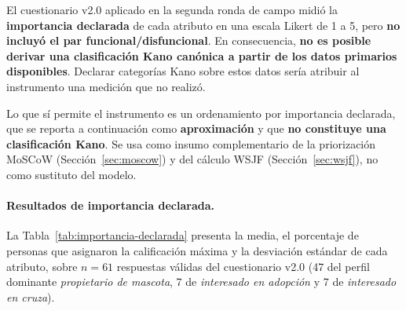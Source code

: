 \documentclass[journal,onecolumn]{IEEEtran}
\begin{document}
	El cuestionario v2.0 aplicado en la segunda ronda de campo midió la
	\textbf{importancia declarada} de cada atributo en una escala Likert de 1 a
	5, pero \textbf{no incluyó el par funcional/disfuncional}. En consecuencia,
	\textbf{no es posible derivar una clasificación Kano canónica a partir de
		los datos primarios disponibles}. Declarar categorías Kano sobre estos datos
	sería atribuir al instrumento una medición que no realizó.
	
	Lo que sí permite el instrumento es un ordenamiento por importancia
	declarada, que se reporta a continuación como \textbf{aproximación} y que
	\textbf{no constituye una clasificación Kano}. Se usa como insumo
	complementario de la priorización MoSCoW (Sección~\ref{sec:moscow}) y del
	cálculo WSJF (Sección~\ref{sec:wsjf}), no como sustituto del modelo.
	
	\paragraph{Resultados de importancia declarada.}
	La Tabla~\ref{tab:importancia-declarada} presenta la media, el porcentaje de
	personas que asignaron la calificación máxima y la desviación estándar de
	cada atributo, sobre $n = 61$ respuestas válidas del cuestionario v2.0
	(47 del perfil dominante \emph{propietario de mascota}, 7 de
	\emph{interesado en adopción} y 7 de \emph{interesado en cruza}).
	
\end{document}
